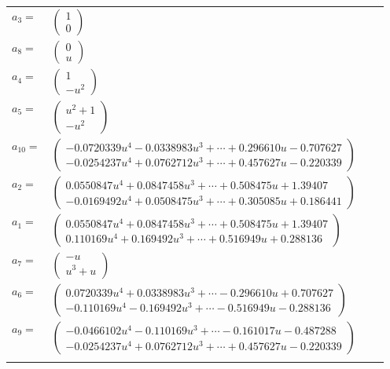 \documentclass[1p]{elsarticle_modified}
\theoremstyle{definition}
\begin{document}
\begin{tabular}{m{7pt} m{180pt} m{7pt} m{180pt} }
\flushright $a_{3}=$&$\begin{pmatrix}1\\0\end{pmatrix}$ \\
\flushright $a_{8}=$&$\begin{pmatrix}0\\u\end{pmatrix}$ \\
\flushright $a_{4}=$&$\begin{pmatrix}1\\- u^2\end{pmatrix}$ \\
\flushright $a_{5}=$&$\begin{pmatrix}u^2+1\\- u^2\end{pmatrix}$ \\
\flushright $a_{10}=$&$\begin{pmatrix}-0.0720339 u^{4}-0.0338983 u^{3}+\cdots+0.296610 u-0.707627\\-0.0254237 u^{4}+0.0762712 u^{3}+\cdots+0.457627 u-0.220339\end{pmatrix}$ \\
\flushright $a_{2}=$&$\begin{pmatrix}0.0550847 u^{4}+0.0847458 u^{3}+\cdots+0.508475 u+1.39407\\-0.0169492 u^{4}+0.0508475 u^{3}+\cdots+0.305085 u+0.186441\end{pmatrix}$ \\
\flushright $a_{1}=$&$\begin{pmatrix}0.0550847 u^{4}+0.0847458 u^{3}+\cdots+0.508475 u+1.39407\\0.110169 u^{4}+0.169492 u^{3}+\cdots+0.516949 u+0.288136\end{pmatrix}$ \\
\flushright $a_{7}=$&$\begin{pmatrix}- u\\u^3+u\end{pmatrix}$ \\
\flushright $a_{6}=$&$\begin{pmatrix}0.0720339 u^{4}+0.0338983 u^{3}+\cdots-0.296610 u+0.707627\\-0.110169 u^{4}-0.169492 u^{3}+\cdots-0.516949 u-0.288136\end{pmatrix}$ \\
\flushright $a_{9}=$&$\begin{pmatrix}-0.0466102 u^{4}-0.110169 u^{3}+\cdots-0.161017 u-0.487288\\-0.0254237 u^{4}+0.0762712 u^{3}+\cdots+0.457627 u-0.220339\end{pmatrix}$\\&\end{tabular}
\end{document}
